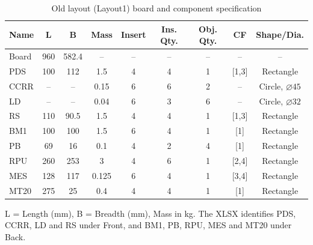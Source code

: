 \documentclass[11pt,a4paper,oneside]{report}
\begin{document}
\begin{table}[H]
\centering
\caption{Old layout (Layout1) board and component specification}
\label{tab:layout_old}
\small
\begin{tabular}{|l|c|c|c|c|c|c|c|c|}
\hline
\textbf{Name} & \textbf{L} & \textbf{B} & \textbf{Mass} & \textbf{Insert} & \textbf{Ins. Qty.} & \textbf{Obj. Qty.} & \textbf{CF} & \textbf{Shape/Dia.} \\
\hline
Board & 960 & 582.4 & -- & -- & -- & -- & -- & -- \\
\hline
PDS & 100 & 112 & 1.5 & 4 & 4 & 1 & [1,3] & Rectangle \\
\hline
CCRR & -- & -- & 0.15 & 6 & 6 & 2 & -- & Circle, $\varnothing45$ \\
\hline
LD & -- & -- & 0.04 & 6 & 3 & 6 & -- & Circle, $\varnothing32$ \\
\hline
RS & 110 & 90.5 & 1.5 & 4 & 4 & 1 & [1,3] & Rectangle \\
\hline
BM1 & 100 & 100 & 1.5 & 6 & 4 & 1 & [1] & Rectangle \\
\hline
PB & 69 & 16 & 0.1 & 4 & 2 & 4 & [1] & Rectangle \\
\hline
RPU & 260 & 253 & 3 & 4 & 6 & 1 & [2,4] & Rectangle \\
\hline
MES & 128 & 117 & 0.125 & 6 & 4 & 1 & [3,4] & Rectangle \\
\hline
MT20 & 275 & 25 & 0.4 & 4 & 4 & 1 & [1] & Rectangle \\
\hline
\end{tabular}
\vspace{2pt}
\parbox{0.94\textwidth}{\footnotesize L = Length (mm), B = Breadth (mm), Mass in kg. The XLSX identifies PDS, CCRR, LD and RS under Front, and BM1, PB, RPU, MES and MT20 under Back.}
\end{table}
\end{document}
